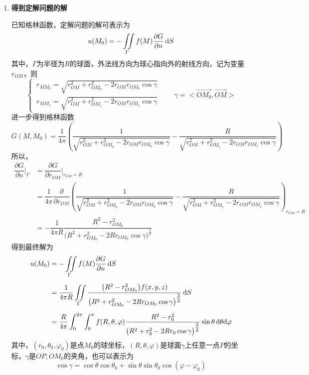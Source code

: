 \begin{enumerate}[\textbf{步骤} 1 ]
	\item \textbf{得到定解问题的解}
	
	已知格林函数，定解问题的解可表示为
	\begin{equation}
		u(M_0) = - \iint \limits_{\Gamma} f(M)\dfrac{\partial G}{\partial n}\, {\rm{d}} S
	\end{equation}
	其中，$\Gamma$为半径为$R$的球面，外法线方向为球心指向外的射线方向，记为变量$r_{OM}$，则
	\begin{equation}
		\begin{cases}
			\, r_{MM_0} = \sqrt{r_{OM}^2+r_{OM_0}^2 - 2 r_{OM}r_{OM_0}\cos \gamma} \\[0.5em]
			\, r_{MM_1} = \sqrt{r_{OM}^2+r_{OM_1}^2 - 2 r_{OM}r_{OM_1}\cos \gamma} 
		\end{cases}
		\quad \quad \gamma = \big<\overrightarrow{OM_0}, \overrightarrow{OM}\big>
	\end{equation}
	进一步得到格林函数
	\begin{equation}
		G(M,M_0) = \dfrac{1}{4\pi} \left(\dfrac{1}{\sqrt{r_{OM}^2+r_{OM_0}^2 - 2 r_{OM}r_{OM_0}\cos \gamma}} - \dfrac{R}{\sqrt{r_{OM}^2+r_{OM_1}^2 - 2 r_{OM}r_{OM_1}\cos \gamma}} \right)
	\end{equation}
	所以，
	\begin{align*}
		\dfrac{\partial G}{\partial n}\Bigg|_{\Gamma} &= \dfrac{\partial G}{\partial r_{OM}}\Bigg|_{r_{OM} = R}\\[0.5em]
		& = \dfrac{1}{4\pi} \dfrac{\partial }{\partial r_{OM}} \left(\dfrac{1}{\sqrt{r_{OM}^2+r_{OM_0}^2 - 2 r_{OM}r_{OM_0}\cos \gamma}} - \dfrac{R}{\sqrt{r_{OM}^2+r_{OM_1}^2 - 2 r_{OM}r_{OM_1}\cos \gamma}} \right)_{r_{OM} = R}\\[0.5em]
		& = -\dfrac{1}{4\pi R} \dfrac{R^2-r_{OM_0}^2}{\big(R^2 + r_{OM_0}^2 - 2Rr_{OM_0} \cos \gamma\big)^{\textstyle \frac{3}{2}}}
	\end{align*}
	得到最终解为
	\begin{align}
		u(M_0) & = - \iint\limits_{\Gamma}f(M) \dfrac{\partial G}{\partial n}\, {\rm{d}} S \notag \\[0.5em]
		& = \dfrac{1}{4\pi R}\iint\limits_{\Gamma} \dfrac{\big(R^2-r_{OM_0}^2\big)f(x,y,z)}{\big(R^2 + r_{OM_0}^2 - 2Rr_{OM_0} \cos \gamma\big)^{\textstyle \frac{3}{2}}}\, {\rm{d}} S\\[0.5em]
		& = \dfrac{R}{4\pi}\int_0^{2\pi}\int_0^{\pi} f(R, \theta, \varphi) \dfrac{R^2 - r_0^2}{\big(R^2+r_0^2 -2Rr_0\cos \gamma \big)^{\textstyle \frac{3}{2}}} \sin \theta \, {\rm{d}} \theta {\rm{d}} \varphi
	\end{align}
	其中，$(r_0,\theta_0,\varphi_0)$是点$M_0$的球坐标，$(R,\theta, \varphi)$是球面$\gamma $上任意一点$P$的坐标，$\gamma$是$OP,OM_0$的夹角，也可以表示为
	\begin{equation}
		\cos \gamma = \cos \theta \cos \theta_0 + \sin \theta \sin \theta_0 \cos(\varphi - \varphi_0)
	\end{equation}
\end{enumerate}





















